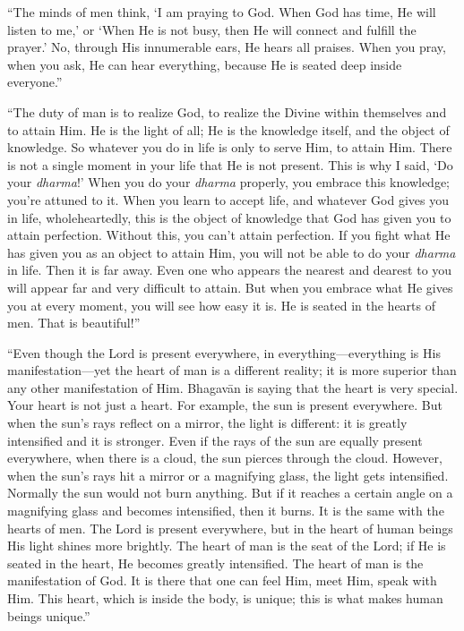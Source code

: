 \enquote{The minds of men think, \enquote{I am praying to God. When God has time, He will listen to me,} or \enquote{When He is not busy, then He will connect and fulfill the prayer.} No, through His innumerable ears, He hears all praises. When you pray, when you ask, He can hear everything, because He is seated deep inside everyone.}

\enquote{The duty of man is to realize God, to realize the Divine within themselves and to attain Him. He is the light of all; He is the knowledge itself, and the object of knowledge. So whatever you do in life is only to serve Him, to attain Him. There is not a single moment in your life that He is not present. This is why I said, \enquote{Do your \textit{dharma}!} When you do your \textit{dharma} properly, you embrace this knowledge; you’re attuned to it. When you learn to accept life, and whatever God gives you in life, wholeheartedly, this is the object of knowledge that God has given you to attain perfection. Without this, you can’t attain perfection. If you fight what He has given you as an object to attain Him, you will not be able to do your \textit{dharma} in life. Then it is far away. Even one who appears the nearest and dearest to you will appear far and very difficult to attain. But when you embrace what He gives you at every moment, you will see how easy it is. He is seated in the hearts of men. That is beautiful!}

\enquote{Even though the Lord is present everywhere, in everything---everything is His manifestation---yet the heart of man is a different reality; it is more superior than any other manifestation of Him. Bhagavān is saying that the heart is very special. Your heart is not just a heart. For example, the sun is present everywhere. But when the sun’s rays reflect on a mirror, the light is different: it is greatly intensified and it is stronger. Even if the rays of the sun are equally present everywhere, when there is a cloud, the sun pierces through the cloud. However, when the sun’s rays hit a mirror or a magnifying glass, the light gets intensified. Normally the sun would not burn anything. But if it reaches a certain angle on a magnifying glass and becomes intensified, then it burns. It is the same with the hearts of men. The Lord is present everywhere, but in the heart of human beings His light shines more brightly. The heart of man is the seat of the Lord; if He is seated in the heart, He becomes greatly intensified. The heart of man is the manifestation of God. It is there that one can feel Him, meet Him, speak with Him. This heart, which is inside the body, is unique; this is what makes human beings unique.}

